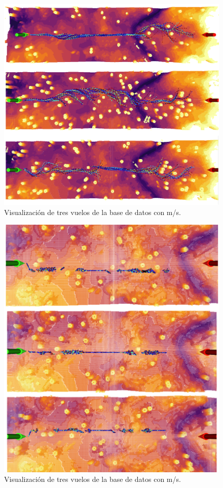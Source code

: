 \begin{figure}[H]
    \centering
    \includegraphics[scale=0.4]{partes/img/7ms-sample.png}
    \caption[Visualización de tres vuelos de la base de datos con  m/s.]{Visualización de tres vuelos de la base de datos con  m/s.}
    \label{fig:7ms-sample}
\end{figure}

\begin{figure}[H]
    \centering
    \includegraphics[scale=0.4]{partes/img/1ms-sample.png}
    \caption[Visualización de tres vuelos de la base de datos con  m/s.]{Visualización de tres vuelos de la base de datos con  m/s.}
    \label{fig:1ms-sample}
\end{figure}

